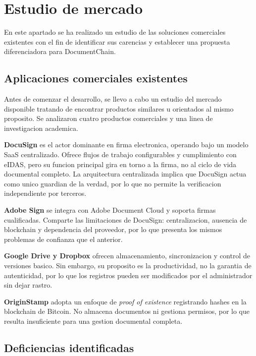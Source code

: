 \documentclass[11pt, a4paper]{article}
\begin{document}
\section{Estudio de mercado}

En este apartado se ha realizado un estudio de las soluciones comerciales existentes con el fin de identificar sus carencias y establecer una propuesta diferenciadora para DocumentChain.

\subsection{Aplicaciones comerciales existentes}

Antes de comenzar el desarrollo, se llevo a cabo un estudio del mercado disponible tratando de encontrar productos similares u orientados al mismo proposito. Se analizaron cuatro productos comerciales y una linea de investigacion academica.

\textbf{DocuSign} es el actor dominante en firma electronica, operando bajo un modelo SaaS centralizado. Ofrece flujos de trabajo configurables y cumplimiento con eIDAS, pero su funcion principal gira en torno a la firma, no al ciclo de vida documental completo. La arquitectura centralizada implica que DocuSign actua como unico guardian de la verdad, por lo que no permite la verificacion independiente por terceros.

\textbf{Adobe Sign} se integra con Adobe Document Cloud y soporta firmas cualificadas. Comparte las limitaciones de DocuSign: centralizacion, ausencia de blockchain y dependencia del proveedor, por lo que presenta los mismos problemas de confianza que el anterior.

\textbf{Google Drive y Dropbox} ofrecen almacenamiento, sincronizacion y control de versiones basico. Sin embargo, su proposito es la productividad, no la garantia de autenticidad, por lo que los registros pueden ser modificados por el administrador sin dejar rastro.

\textbf{OriginStamp} adopta un enfoque de \textit{proof of existence} registrando hashes en la blockchain de Bitcoin. No almacena documentos ni gestiona permisos, por lo que resulta insuficiente para una gestion documental completa.

\subsection{Deficiencias identificadas}
\end{document}
